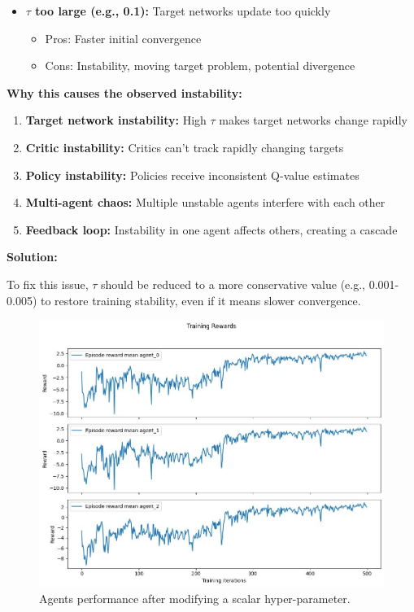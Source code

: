 \documentclass[12pt]{article}
\begin{document}
{{{{{{\begin{enumerate}
\begin{enumerate}
\begin{itemize}
            \item \textbf{$\tau$ too large (e.g., 0.1):} Target networks update too quickly
            \begin{itemize}
                \item Pros: Faster initial convergence
                \item Cons: Instability, moving target problem, potential divergence
            \end{itemize}
        \end{itemize}
        
        \textbf{Why this causes the observed instability:}
        
        \begin{enumerate}
            \item \textbf{Target network instability:} High $\tau$ makes target networks change rapidly
            \item \textbf{Critic instability:} Critics can't track rapidly changing targets
            \item \textbf{Policy instability:} Policies receive inconsistent Q-value estimates
            \item \textbf{Multi-agent chaos:} Multiple unstable agents interfere with each other
            \item \textbf{Feedback loop:} Instability in one agent affects others, creating a cascade
        \end{enumerate}
        
        \textbf{Solution:}
        
        To fix this issue, $\tau$ should be reduced to a more conservative value (e.g., 0.001-0.005) to restore training stability, even if it means slower convergence.
        
    \end{enumerate}
\end{enumerate}

\begin{figure}[h!]
    \centering
    \includegraphics[width=0.75\linewidth]{figs/results.jpg}
    \caption{Agents performance after modifying a scalar hyper-parameter.}
    \label{fig:unstable_learning}
\end{figure}

}}}}}}
\end{document}
